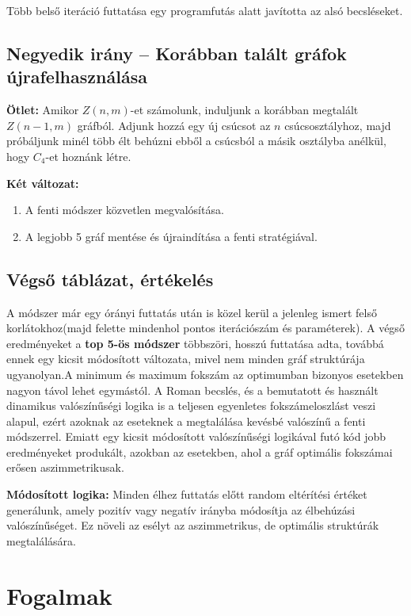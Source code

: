 \documentclass[12pt,a4paper]{article}
\begin{document}
Több belső iteráció futtatása egy programfutás alatt javította az alsó becsléseket.

\subsection*{Negyedik irány – Korábban talált gráfok újrafelhasználása}

\textbf{Ötlet:} Amikor $Z(n,m)$-et számolunk, induljunk a korábban megtalált $Z(n-1, m)$ gráfból. Adjunk hozzá egy új csúcsot az $n$ csúcsosztályhoz, majd próbáljunk minél több élt behúzni ebből a csúcsból a másik osztályba anélkül, hogy $C_4$-et hoznánk létre.

\textbf{Két változat:}
\begin{enumerate}
    \item A fenti módszer közvetlen megvalósítása.
    \item A legjobb 5 gráf mentése és újraindítása a fenti stratégiával.
\end{enumerate}

\subsection*{Végső táblázat, értékelés}

A módszer már egy órányi futtatás után is közel kerül a jelenleg ismert felső korlátokhoz(majd felette mindenhol pontos iterációszám és paraméterek). A végső eredményeket a \textbf{top 5-ös módszer} többszöri, hosszú futtatása adta, továbbá ennek egy kicsit módosított változata, mivel nem minden gráf struktúrája ugyanolyan.A minimum és maximum fokszám az optimumban bizonyos esetekben nagyon távol lehet egymástól. A Roman becslés, és a bemutatott és használt dinamikus valószínűségi logika is a teljesen egyenletes fokszámeloszlást veszi alapul, ezért azoknak az eseteknek a megtalálása kevésbé valószínű a fenti módszerrel.
Emiatt egy kicsit módosított valószínűségi logikával futó kód jobb eredményeket produkált, azokban az esetekben, ahol a gráf optimális fokszámai erősen aszimmetrikusak.

\textbf{Módosított logika:} Minden élhez futtatás előtt random eltérítési értéket generálunk, amely pozitív vagy negatív irányba módosítja az élbehúzási valószínűséget. Ez növeli az esélyt az aszimmetrikus, de optimális struktúrák megtalálására.

\section*{Fogalmak}
\end{document}
